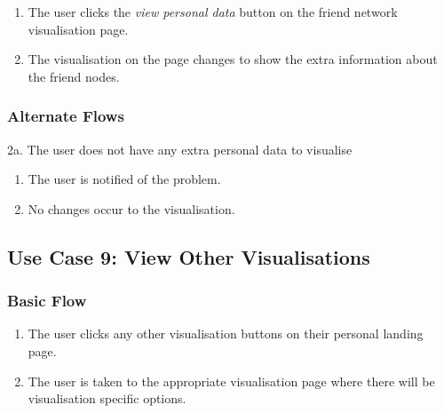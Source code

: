 \documentclass[12pt,onecolumn]{article}
\begin{document}
		\begin{enumerate}
			\item The user clicks the \emph{view personal data} button on the friend network visualisation page.

			\item The visualisation on the page changes to show the extra information about the friend nodes. 	

		\end{enumerate}

		\subsubsection{Alternate Flows}

		2a. The user does not have any extra personal data to visualise

		\begin{enumerate}
			\item The user is notified of the problem.

			\item No changes occur to the visualisation.

		\end{enumerate}	

	\subsection{Use Case 9: View Other Visualisations}

		\subsubsection{Basic Flow}

		\begin{enumerate}
			\item The user clicks any other visualisation buttons on their personal landing page.

			\item The user is taken to the appropriate visualisation page where there will be visualisation specific options. 	

		\end{enumerate}
	
	
		
\end{document}
